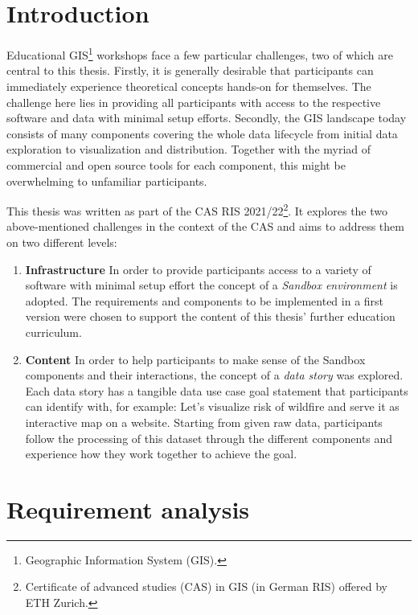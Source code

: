 \documentclass[11pt, a4paper, oneside, parskip=full-]{scrartcl}
\begin{document}
\section{Introduction}
Educational GIS\footnote{Geographic Information System (GIS).} workshops face a
few particular challenges, two of which are central to this thesis. Firstly, it
is generally desirable that participants can immediately experience theoretical
concepts hands-on for themselves. The challenge here lies in providing all
participants with access to the respective software and data with minimal setup
efforts. Secondly, the GIS landscape today consists of many components covering
the whole data lifecycle from initial data exploration to visualization and
distribution. Together with the myriad of commercial and open source tools for
each component, this might be overwhelming to unfamiliar participants.

This thesis was written as part of the CAS RIS 2021/22\footnote{Certificate of
advanced studies (CAS) in GIS (in German RIS) offered by ETH Zurich.}. It
explores the two above-mentioned challenges in the context of the CAS and aims
to address them on two different levels:
\begin{enumerate}
  \item \textbf{Infrastructure} In order to provide participants access to a
  variety of software with minimal setup effort the concept of a \emph{Sandbox
  environment} is adopted. The requirements and components to be implemented in
  a first version were chosen to support the content of this thesis' further
  education curriculum.
  \item \textbf{Content} In order to help participants to make sense of the
  Sandbox components and their interactions, the concept of a \emph{data story}
  was explored. Each data story has a tangible data use case goal statement that
  participants can identify with, for example: Let's visualize risk of wildfire
  and serve it as interactive map on a website. Starting from given raw data,
  participants follow the processing of this dataset through the different
  components and experience how they work together to achieve the goal.
\end{enumerate}


\section{Requirement analysis} \label{sectionrequirements}
\end{document}
